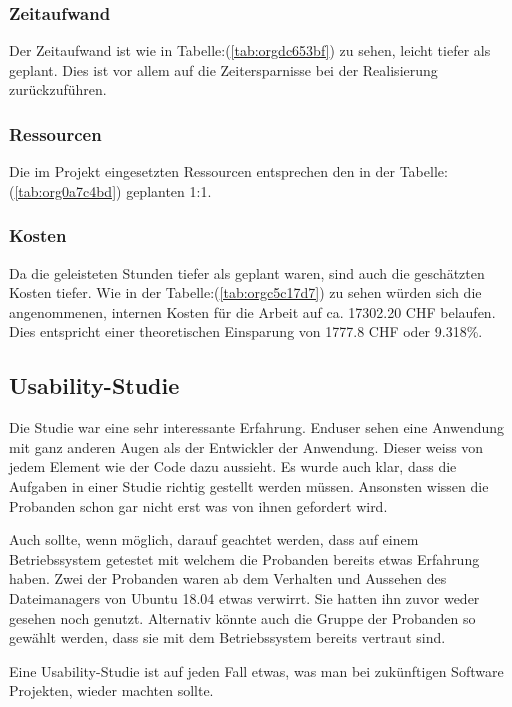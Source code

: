 \subsubsection{Zeitaufwand}
\label{sec:orgd0a21b2}

Der Zeitaufwand ist wie in Tabelle:(\ref{tab:orgdc653bf}) zu sehen, leicht tiefer als
geplant. Dies ist vor allem auf die Zeitersparnisse bei der Realisierung
zurückzuführen.

\subsubsection{Ressourcen}
\label{sec:org2b5e3d5}

Die im Projekt eingesetzten Ressourcen entsprechen den in der
Tabelle:(\ref{tab:org0a7c4bd}) geplanten 1:1.

\subsubsection{Kosten}
\label{sec:org30be751}

Da die geleisteten Stunden tiefer als geplant waren, sind auch die geschätzten
Kosten tiefer. Wie in der Tabelle:(\ref{tab:orgc5c17d7}) zu sehen würden sich die
angenommenen, internen Kosten für die Arbeit auf ca. 17302.20 CHF belaufen.
Dies entspricht einer theoretischen Einsparung von 1777.8 CHF oder 9.318\%.

\subsection{Usability-Studie}
\label{sec:orgd81cd12}

Die Studie war eine sehr interessante Erfahrung. Enduser sehen eine Anwendung
mit ganz anderen Augen als der Entwickler der Anwendung. Dieser weiss von jedem
Element wie der Code dazu aussieht. Es wurde auch klar, dass die Aufgaben in
einer Studie richtig gestellt werden müssen. Ansonsten wissen die Probanden
schon gar nicht erst was von ihnen gefordert wird.

Auch sollte, wenn möglich, darauf geachtet werden, dass auf einem Betriebssystem
getestet mit welchem die Probanden bereits etwas Erfahrung haben. Zwei der
Probanden waren ab dem Verhalten und Aussehen des Dateimanagers von Ubuntu
18.04 etwas verwirrt. Sie hatten ihn zuvor weder gesehen noch genutzt.
Alternativ könnte auch die Gruppe der Probanden so gewählt werden, dass sie mit
dem Betriebssystem bereits vertraut sind.

Eine Usability-Studie ist auf jeden Fall etwas, was man bei
zukünftigen Software Projekten, wieder machten sollte.


